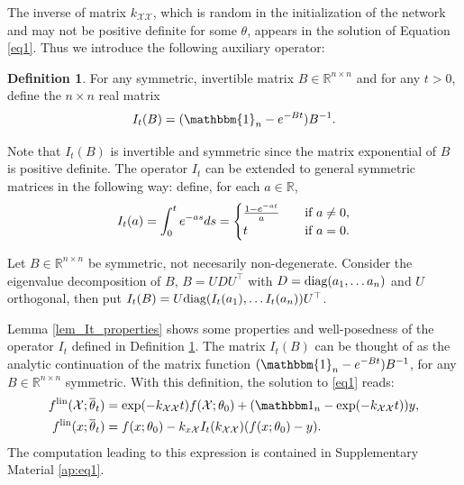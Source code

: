 \documentclass{article}
\theoremstyle{definition}
\newtheorem{defn}[thm]{Definition}
\theoremstyle{remark}
\numberwithin{equation}{section}
\newcommand{\X}{\mathcal{X}}
\newcommand{\R}{\mathbb{R}}
\newcommand{\ktest}{k_{x\X}}
\newcommand{\ktrain}{k_{\X\X}}
\newcommand{\lin}{{\textup{lin}}}
\begin{document}
The inverse of matrix $\ktrain$, which is random in the initialization of the network and may not be positive definite for some $\theta$,
 appears in the solution of Equation \eqref{eq1}.
 Thus we introduce the following auxiliary operator:

\begin{defn}
\label{def:It}
    For any symmetric, invertible matrix $B \in \R^{n \times n}$ and for any $t > 0$, define the $n\times n$ real matrix
    \[
        I_t(B) = (\mathbbm{1}_n - e^{-Bt})B^{-1}.
    \]

    Note that $I_t(B)$ is invertible and symmetric since the matrix exponential of $B$ is positive definite.
    The operator $I_t$ can be extended to general symmetric matrices in the following way: define, for each $a \in \R$,
    \[
    I_t(a) = \int_0^te^{-as}ds = \begin{cases}
        \frac{1-e^{-at}}{a} \quad &\textup{if }a \ne 0, \\
        t \quad &\textup{if }a=0.
    \end{cases}
    \]
    
    Let $B\in \R^{n \times n}$ be symmetric, not necesarily non-degenerate.
    Consider the eigenvalue decomposition of $B$, $B = UDU^\top $ with $D=\textup{diag}(a_1, \ldots a_n)$ and $U$ orthogonal, then put $I_t(B) = U \textup{diag}(I_t(a_1), \ldots I_t(a_n)) U^\top $.
    \end{defn}

Lemma \ref{lem_It_properties} shows some properties and well-posedness of the operator $I_t$ defined in Definition \ref{def:It}.
The matrix $I_t(B)$ can be thought of as the analytic continuation of the matrix function $(\mathbbm{1}_n - e^{-Bt})B^{-1}$, for any $B \in \R^{n \times n}$ symmetric.
With this definition, the solution to \eqref{eq1} reads:
\begin{align}
    \label{eq1:soltrain} f^\lin(\X;\overline \theta_t) &=\exp(-\ktrain t)f(\X;\theta_0) + (\mathbbm 1_n - \exp(-\ktrain t))y, \\
    \label{eq1:soltest} f^\lin(x;\overline \theta_t)&= f(x;\theta_0) -\ktest I_t(\ktrain)(f(x;\theta_0)-y).
\end{align}
The computation leading to this expression is contained in Supplementary Material \ref{ap:eq1}.
\end{document}
